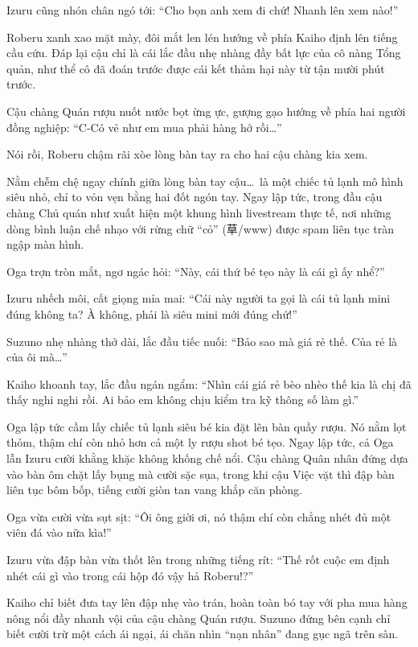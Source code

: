 \documentclass[../main.tex]{subfiles}
\begin{document}
Izuru cũng nhón chân ngó tới: ``Cho bọn anh xem đi chứ! Nhanh lên xem nào!''

Roberu xanh xao mặt mày, đôi mắt len lén hướng về phía Kaiho định lên tiếng cầu cứu. Đáp lại cậu chỉ là cái lắc đầu nhẹ nhàng đầy bất lực của cô nàng Tổng quản, như thể cô đã đoán trước được cái kết thảm hại này từ tận mười phút trước.

Cậu chàng Quán rượu nuốt nước bọt ừng ực, gượng gạo hướng về phía hai người đồng nghiệp: ``C-Có vẻ như em mua phải hàng hớ rồi\dots''

Nói rồi, Roberu chậm rãi xòe lòng bàn tay ra cho hai cậu chàng kia xem.

Nằm chễm chệ ngay chính giữa lòng bàn tay cậu\dots\ là một chiếc tủ lạnh mô hình siêu nhỏ, chỉ to vỏn vẹn bằng hai đốt ngón tay. Ngay lập tức, trong đầu cậu chàng Chủ quán như xuất hiện một khung hình livestream thực tế, nơi những dòng bình luận chế nhạo với rừng chữ ``cỏ'' (草/www) được spam liên tục tràn ngập màn hình.


Oga trợn tròn mắt, ngơ ngác hỏi: ``Này, cái thứ bé tẹo này là cái gì ấy nhể?''

Izuru nhếch môi, cất giọng mỉa mai: ``Cái này người ta gọi là cái tủ lạnh mini đúng không ta? À không, phải là siêu mini mới đúng chứ!''

Suzuno nhẹ nhàng thở dài, lắc đầu tiếc nuối: ``Bảo sao mà giá rẻ thế. Của rẻ là của ôi mà\dots''

Kaiho khoanh tay, lắc đầu ngán ngẩm: ``Nhìn cái giá rẻ bèo nhèo thế kia là chị đã thấy nghi nghi rồi. Ai bảo em không chịu kiểm tra kỹ thông số làm gì.''

Oga lập tức cầm lấy chiếc tủ lạnh siêu bé kia đặt lên bàn quầy rượu. Nó nằm lọt thỏm, thậm chí còn nhỏ hơn cả một ly rượu shot bé tẹo. Ngay lập tức, cả Oga lẫn Izuru cười khằng khặc không khống chế nổi. Cậu chàng Quân nhân đứng dựa vào bàn ôm chặt lấy bụng mà cười sặc sụa, trong khi cậu Việc vặt thì đập bàn liên tục bôm bốp, tiếng cười giòn tan vang khắp căn phòng.

Oga vừa cười vừa sụt sịt: ``Ôi ông giời ơi, nó thậm chí còn chẳng nhét đủ một viên đá vào nữa kìa!''

Izuru vừa đập bàn vừa thốt lên trong những tiếng rít: ``Thế rốt cuộc em định nhét cái gì vào trong cái hộp đó vậy hả Roberu!?''

Kaiho chỉ biết đưa tay lên đập nhẹ vào trán, hoàn toàn bó tay với pha mua hàng nông nổi đầy nhanh vội của cậu chàng Quán rượu. Suzuno đứng bên cạnh chỉ biết cười trừ một cách ái ngại, ái chăn nhìn ``nạn nhân'' đang gục ngã trên sàn.
\end{document}
